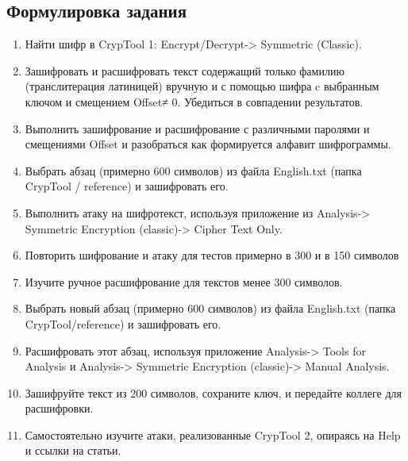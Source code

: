 \documentclass[a4paper, 14pt]{extarticle}
\begin{document}
\subsection{Формулировка задания}
\begin{enumerate}
    \item Найти шифр в CrypTool 1: Encrypt/Decrypt-> Symmetric (Classic).
    \item Зашифровать и расшифровать текст содержащий только фамилию (транслитерация латиницей) вручную и с помощью шифра c выбранным ключом и смещением Offset≠ 0. Убедиться в совпадении результатов.
    \item Выполнить зашифрование и расшифрование с различными паролями и смещениями Offset и разобраться как формируется алфавит шифрограммы.
    \item Выбрать абзац (примерно 600 символов) из файла English.txt (папка CrypTool / reference) и зашифровать его.
    \item Выполнить атаку на шифротекст, используя приложение из Analysis-> Symmetric Encryption (classic)-> Cipher Text Only.
    \item Повторить шифрование и атаку для тестов примерно в 300 и в 150 символов
    \item Изучите ручное расшифрование для текстов менее 300 символов.
    \item Выбрать новый абзац (примерно 600 символов) из файла English.txt (папка CrypTool/reference) и зашифровать его.
    \item Расшифровать этот абзац, используя приложение Analysis-> Tools for Analysis и Analysis-> Symmetric Encryption (classic)-> Manual Analysis.
    \item  Зашифруйте текст из 200 символов, сохраните ключ, и передайте коллеге для расшифровки.
    \item  Самостоятельно изучите атаки, реализованные CrypTool 2, опираясь на Help и ссылки на статьи.
\end{enumerate}
\end{document}
